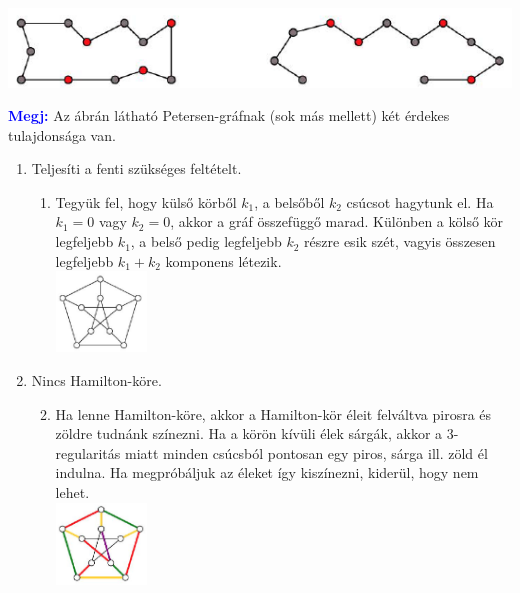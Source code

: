 \documentclass[../../szobeli.tex]{subfiles}
\begin{document}
\begin{itemize}
        \includegraphics[width=\textwidth]{./img/4.png}

        \textcolor{blue}{\textbf{Megj:}} Az ábrán látható Petersen-gráfnak (sok más mellett) két érdekes tulajdonsága van. 

            \begin{enumerate}
                \item Teljesíti a fenti szükséges feltételt. 
                    \begin{enumerate}
                        \item Tegyük fel, hogy külső körből $k_1$, a belsőből $k_2$ csúcsot hagytunk el. Ha $k_1 = 0$ vagy $k_2 = 0$, akkor a gráf összefüggő marad. Különben a kölső kör legfeljebb $k_1$, a belső pedig legfeljebb $k_2$ részre esik szét, vagyis összesen legfeljebb $k_1 + k_2$ komponens létezik. \\ \includegraphics[width=0.2\textwidth]{./img/5.png}
                    \end{enumerate}
                \item Nincs Hamilton-köre.
                    \begin{enumerate}
                        \setcounter{enumi}{1}
                        \item Ha lenne Hamilton-köre, akkor a Hamilton-kör éleit felváltva pirosra és zöldre tudnánk színezni. Ha a körön kívüli élek sárgák, akkor a 3-regularitás miatt minden csúcsból pontosan egy piros, sárga ill. zöld él indulna. Ha megpróbáljuk az éleket így kiszínezni, kiderül, hogy nem lehet. \\ \includegraphics[width=0.2\textwidth]{./img/6.png}
                    \end{enumerate}
            \end{enumerate}
        

\end{itemize}
\end{document}
